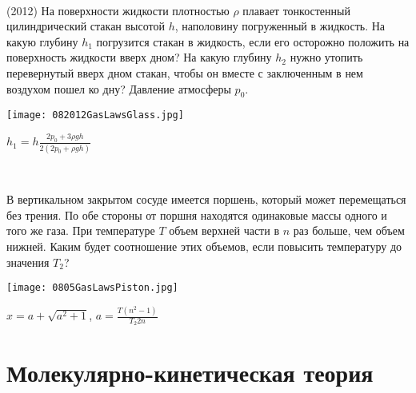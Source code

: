 \begin{ex}
\hspace{0pt} \\
\begin{minipage}{.65\textwidth}
(2012) На поверхности жидкости плотностью $\rho$ плавает тонкостенный цилиндрический стакан высотой $h$, наполовину погруженный в жидкость. 
На какую глубину $h_1$ погрузится стакан в жидкость, если его осторожно положить на поверхность жидкости вверх дном? 
На какую глубину $h_2$ нужно утопить перевернутый вверх дном стакан, чтобы он вместе с заключенным в нем воздухом пошел ко дну? Давление атмосферы $p_0$.
\end{minipage}
\begin{minipage}{.35\textwidth}
\centering
\texttt{[image: 082012GasLawsGlass.jpg]}
\end{minipage}
\begin{ans}
$h_1 = h \frac{2p_0+3\rho gh}{2(2p_0 + \rho gh)}$
\end{ans}
\end{ex}

\begin{ex}
\hspace{0pt} \\
\begin{minipage}{.65\textwidth}
В вертикальном закрытом сосуде имеется поршень, который может перемещаться без трения. 
По обе стороны от поршня находятся одинаковые массы одного и того же газа. 
При температуре $T$ объем верхней части в $n$ раз больше, чем объем нижней. 
Каким будет соотношение этих объемов, если повысить температуру до значения $T_2$?
\end{minipage}
\begin{minipage}{.35\textwidth}
\centering
\texttt{[image: 0805GasLawsPiston.jpg]}
\end{minipage}
\begin{ans}
$x = a + \sqrt{a^2+1}$, $a = \frac{T (n^2 - 1)}{T_2 2n}$
\end{ans}
\end{ex}

\section{Молекулярно-кинетическая теория}


